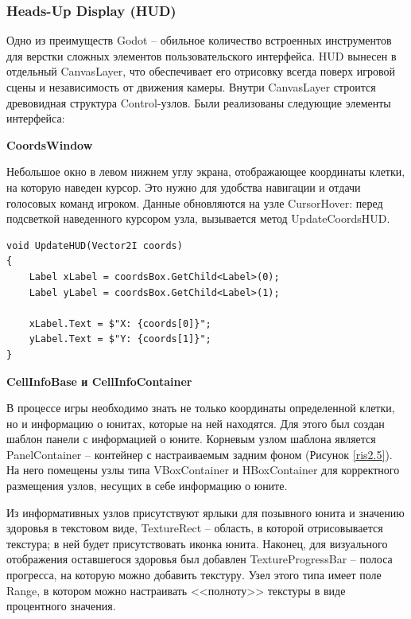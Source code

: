         
        \subsubsection{Heads-Up Display (HUD)}

            Одно из преимуществ Godot -- обильное количество встроенных инструментов для верстки сложных элементов пользовательского интерфейса. HUD вынесен в отдельный CanvasLayer, что обеспечивает его отрисовку всегда поверх игровой сцены и независимость от движения камеры. Внутри CanvasLayer строится древовидная структура Control-узлов. Были реализованы следующие элементы интерфейса:

            \textbf{CoordsWindow}

            Небольшое окно в левом нижнем углу экрана, отображающее координаты клетки, на которую наведен курсор. Это нужно для удобства навигации и отдачи голосовых команд игроком. Данные обновляются на узле CursorHover: перед подсветкой наведенного курсором узла, вызывается метод UpdateCoordsHUD.
            \begin{lstlisting}[caption=обновление интерфейса]
void UpdateHUD(Vector2I coords)
{
    Label xLabel = coordsBox.GetChild<Label>(0);
    Label yLabel = coordsBox.GetChild<Label>(1);

    xLabel.Text = $"X: {coords[0]}";
    yLabel.Text = $"Y: {coords[1]}";
}
            \end{lstlisting}

            \textbf{CellInfoBase и CellInfoContainer}
            
            В процессе игры необходимо знать не только координаты определенной клетки, но и информацию о юнитах, которые на ней находятся. Для этого был создан шаблон панели с информацией о юните. Корневым узлом шаблона является PanelContainer -- контейнер с настраиваемым задним фоном (Рисунок \ref{ris2.5}). На него помещены узлы типа VBoxContainer и HBoxContainer для корректного размещения узлов, несущих в себе информацию о юните.

            Из информативных узлов присутствуют ярлыки для позывного юнита и значению здоровья в текстовом виде, TextureRect -- область, в которой отрисовывается текстура; в ней будет присутствовать иконка юнита. Наконец, для визуального отображения оставшегося здоровья был добавлен TextureProgressBar -- полоса прогресса, на которую можно добавить текстуру. Узел этого типа имеет поле Range, в котором можно настраивать <<полноту>> текстуры в виде процентного значения.

